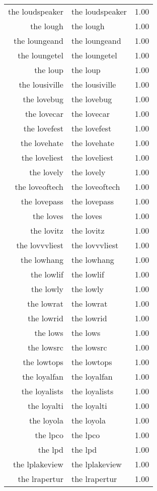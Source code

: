 \begin{table}[ht]
\begin{tabular}{rlr}
  the loudspeaker & the loudspeaker & 1.00 \\ 
  the lough & the lough & 1.00 \\ 
  the loungeand & the loungeand & 1.00 \\ 
  the loungetel & the loungetel & 1.00 \\ 
  the loup & the loup & 1.00 \\ 
  the lousiville & the lousiville & 1.00 \\ 
  the lovebug & the lovebug & 1.00 \\ 
  the lovecar & the lovecar & 1.00 \\ 
  the lovefest & the lovefest & 1.00 \\ 
  the lovehate & the lovehate & 1.00 \\ 
  the loveliest & the loveliest & 1.00 \\ 
  the lovely & the lovely & 1.00 \\ 
  the loveoftech & the loveoftech & 1.00 \\ 
  the lovepass & the lovepass & 1.00 \\ 
  the loves & the loves & 1.00 \\ 
  the lovitz & the lovitz & 1.00 \\ 
  the lovvvliest & the lovvvliest & 1.00 \\ 
  the lowhang & the lowhang & 1.00 \\ 
  the lowlif & the lowlif & 1.00 \\ 
  the lowly & the lowly & 1.00 \\ 
  the lowrat & the lowrat & 1.00 \\ 
  the lowrid & the lowrid & 1.00 \\ 
  the lows & the lows & 1.00 \\ 
  the lowsrc & the lowsrc & 1.00 \\ 
  the lowtops & the lowtops & 1.00 \\ 
  the loyalfan & the loyalfan & 1.00 \\ 
  the loyalists & the loyalists & 1.00 \\ 
  the loyalti & the loyalti & 1.00 \\ 
  the loyola & the loyola & 1.00 \\ 
  the lpco & the lpco & 1.00 \\ 
  the lpd & the lpd & 1.00 \\ 
  the lplakeview & the lplakeview & 1.00 \\ 
  the lrapertur & the lrapertur & 1.00 \\ 

\end{tabular}
\end{table}
